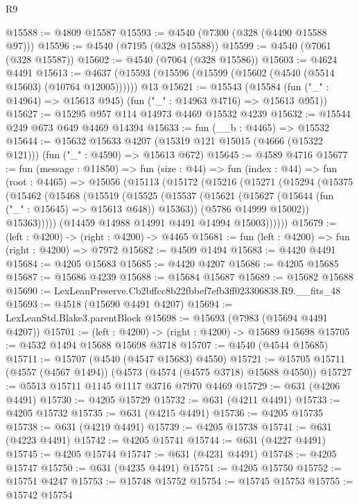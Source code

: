 \begin{lexlean}{R9}
\begin{coremodule}
@15588 := @4809 @15587
@15593 := @4540 (@7300 (@328 (@4490 @15588 @97)))
@15596 := @4540 (@7195 (@328 @15588))
@15599 := @4540 (@7061 (@328 @15587))
@15602 := @4540 (@7064 (@328 @15586))
@15603 := @4624 @4491
@15613 := @4637 (@15593 (@15596 (@15599 (@15602 (@4540 (@5514 @15603) (@10764 @12005)))))) @13
@15621 := @15543
    (@15584 (fun ("_" : @14964) => @15613 @945) (fun ("_" : @14963 @4716) => @15613 @951))
@15627 := @15295 @957 @114 @14973 @4469 @15532 @4239
@15632 := @15544 @249 @673 @649 @4469 @14394
@15633 := fun (__b : @4465) => @15532
@15644 := @15632
    @15633
    @4207
    (@15319 @121 @15015 (@4666 (@15322 @121)))
    (fun ("_" : @4590) => @15613 @672)
@15645 := @4589 @4716
@15677 := fun (message : @11850) =>
  fun (size : @44) =>
  fun (index : @44) =>
  fun (root : @4465) =>
  @15056
    (@15113
      (@15172
        (@15216
          (@15271
            (@15294
              (@15375
                (@15462
                  (@15468
                    (@15519
                      (@15525
                        (@15537
                          (@15621 (@15627 (@15644 (fun ("_" : @15645) => @15613 @648)) @15363))
                          (@5786 @14999 @15002))
                        @15363)))))
              (@14459 @14988 @14991 @4491 @14994 @15003))))))
@15679 := (left : @4200) -> (right : @4200) -> @4465
@15681 := fun (left : @4200) => fun (right : @4200) => @7972
@15682 := @4509 @1494
@15683 := @4420 @4491
@15684 := @4205 @15683
@15685 := @4420 @4207
@15686 := @4205 @15685
@15687 := @15686 @4239
@15688 := @15684 @15687
@15689 := @15682 @15688
@15690 := LexLeanPreserve.Cb2bffcc8b22fbbef7efb3ff023306838.R9.__fits_48
@15693 := @4518 (@15690 @4491 @4207)
@15694 := LexLeanStd.Blake3.parentBlock
@15698 := @15693 (@7983 (@15694 @4491 @4207))
@15701 := (left : @4200) -> (right : @4200) -> @15689 @15698
@15705 := @4532 @1494 @15688 @15698 @3718
@15707 := @4540 (@4544 @15685)
@15711 := @15707 (@4540 (@4547 @15683) @4550)
@15721 := @15705 @15711 (@4557 (@4567 @1494)) (@4573 (@4574 (@4575 @3718) @15688 @4550))
@15727 := @5513 @15711 @1145 @1117 @3716 @7970 @4469
@15729 := @631 (@4206 @4491)
@15730 := @4205 @15729
@15732 := @631 (@4211 @4491)
@15733 := @4205 @15732
@15735 := @631 (@4215 @4491)
@15736 := @4205 @15735
@15738 := @631 (@4219 @4491)
@15739 := @4205 @15738
@15741 := @631 (@4223 @4491)
@15742 := @4205 @15741
@15744 := @631 (@4227 @4491)
@15745 := @4205 @15744
@15747 := @631 (@4231 @4491)
@15748 := @4205 @15747
@15750 := @631 (@4235 @4491)
@15751 := @4205 @15750
@15752 := @15751 @4247
@15753 := @15748 @15752
@15754 := @15745 @15753
@15755 := @15742 @15754

\end{coremodule}
\end{lexlean}
